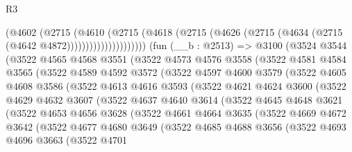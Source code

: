 \begin{lexlean}{R3}
\begin{coremodule}
                        (@4602
                          (@2715
                            (@4610
                              (@2715
                                (@4618
                                  (@2715
                                    (@4626 (@2715 (@4634 (@2715 (@4642 @4872)))))))))))))))))))))
    (fun (__b : @2513) =>
    @3100
      (@3524
        @3544
        (@3522
          @4565
          @4568
          @3551
          (@3522
            @4573
            @4576
            @3558
            (@3522
              @4581
              @4584
              @3565
              (@3522
                @4589
                @4592
                @3572
                (@3522
                  @4597
                  @4600
                  @3579
                  (@3522
                    @4605
                    @4608
                    @3586
                    (@3522
                      @4613
                      @4616
                      @3593
                      (@3522
                        @4621
                        @4624
                        @3600
                        (@3522
                          @4629
                          @4632
                          @3607
                          (@3522
                            @4637
                            @4640
                            @3614
                            (@3522
                              @4645
                              @4648
                              @3621
                              (@3522
                                @4653
                                @4656
                                @3628
                                (@3522
                                  @4661
                                  @4664
                                  @3635
                                  (@3522
                                    @4669
                                    @4672
                                    @3642
                                    (@3522
                                      @4677
                                      @4680
                                      @3649
                                      (@3522
                                        @4685
                                        @4688
                                        @3656
                                        (@3522
                                          @4693
                                          @4696
                                          @3663
                                          (@3522
                                            @4701

\end{coremodule}
\end{lexlean}
